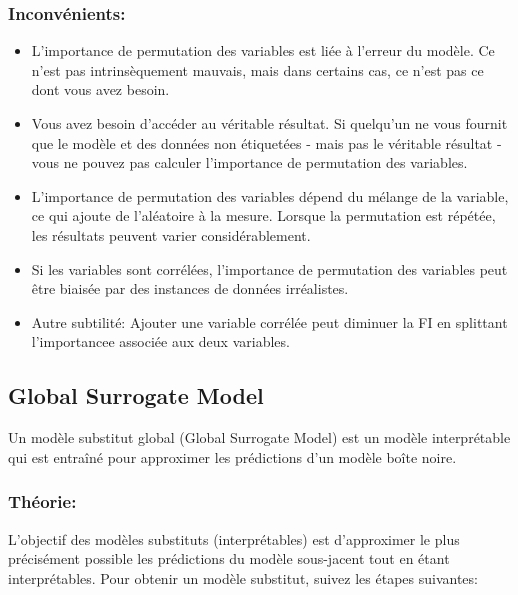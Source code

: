 \subsubsection{Inconvénients:}
\begin{itemize}
    \item L'importance de permutation des variables est liée à l'erreur du modèle. Ce n'est pas intrinsèquement mauvais, mais dans certains cas, ce n'est pas ce dont vous avez besoin.
    \item Vous avez besoin d'accéder au véritable résultat. Si quelqu'un ne vous fournit que le modèle et des données non étiquetées - mais pas le véritable résultat - vous ne pouvez pas calculer l'importance de permutation des variables.
    \item L'importance de permutation des variables dépend du mélange de la variable, ce qui ajoute de l'aléatoire à la mesure. Lorsque la permutation est répétée, les résultats peuvent varier considérablement.
    \item Si les variables sont corrélées, l'importance de permutation des variables peut être biaisée par des instances de données irréalistes.
    \item Autre subtilité: Ajouter une variable corrélée peut diminuer la FI en splittant l'importancee associée aux deux variables.
\end{itemize}

\subsection{Global Surrogate Model}

Un modèle substitut global (Global Surrogate Model) est un modèle interprétable qui est entraîné pour approximer les prédictions d'un modèle boîte noire.

\subsubsection{Théorie:}

L'objectif des modèles substituts (interprétables) est d'approximer le plus précisément possible les prédictions du modèle sous-jacent tout en étant interprétables. Pour obtenir un modèle substitut, suivez les étapes suivantes:

